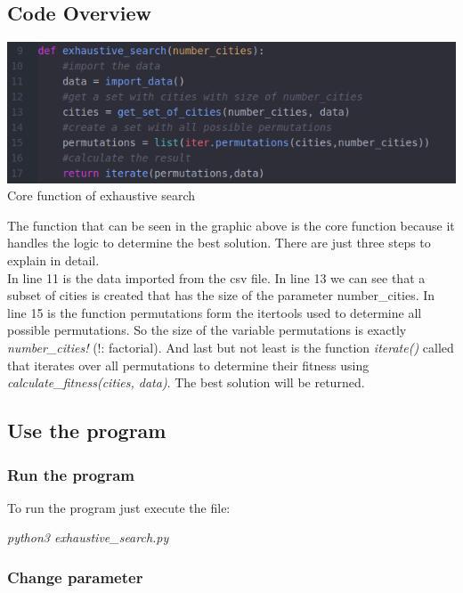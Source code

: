 \documentclass[10pt,a4paper]{article}
\begin{document}
	\subsection{Code Overview}	
	\begin{center}
		\includegraphics[width=1.0\linewidth]{pictures/exhaustiveSearch/code_exhaustive_search}
	\\
	Core function of exhaustive search	
	\\	
	\end{center}
	The function that can be seen in the graphic above is the core function because it handles the logic to determine the best solution. There are just three steps to explain in detail.\\
	In line 11 is the data imported from the csv file. In line 13 we can see that a subset of cities is created that has the size of the parameter number\_cities. In line 15 is the function permutations form the itertools used to determine all possible permutations. So the size of the variable permutations is exactly \textit{number\_cities!} (!: factorial).
	And last but not least is the function \textit{iterate()} called that iterates over all permutations to determine their fitness using \textit{calculate\_fitness(cities, data)}. The best solution will be returned.
	\subsection{Use the program}
	\subsubsection{Run the program}
	To run the program just execute the file: 
	\begin{center}
		\textit{python3 exhaustive\_search.py}
	\end{center}
	\subsubsection{Change parameter}
	
\end{document}
